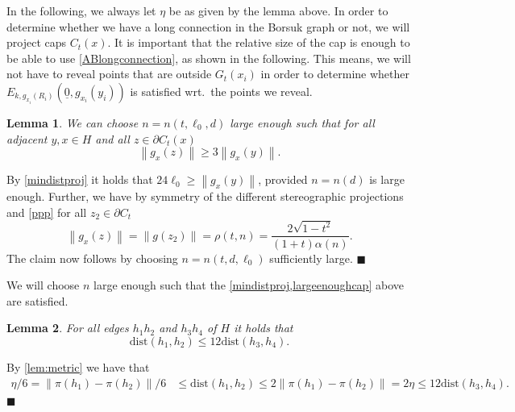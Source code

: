 \documentclass[11pt]{article}%
\newenvironment{proof}{\vspace{1ex}\noindent{\bf Proof.}}{\hspace*{\fill}$\blacksquare$\vspace{1ex}}
\newtheorem{lemma}[lemma]{Lemma}
\newcommand{\norm}[1]{\ensuremath{\left\|#1\right\|}}
\newcommand{\dists}{{\mathrm{dist}}}
\newcommand{\typ}{\underline{0}}
\begin{document}
\noindent
 In the following, we always let $ \eta $ be as given by the lemma above. In order to determine whether we have a long connection in the Borsuk graph or not, we will project caps $ C_t(x) $. It is important that the relative size of the cap is enough to be able to use \cref{ABlongconnection}, as shown in the following. This means, we will not have to reveal points that are outside  $ G_t(x_i) $ in order to determine whether $ E_{k,g_{x_i}(R_i)}(\typ,g_{x_i}(y_i))$ is satisfied 
 wrt.~the points we reveal.
 \begin{lemma}\label{largeenoughcap}
 	We can choose $ n=n(t,\ell_0,d) $ large enough such that for all adjacent $ y,x\in H $ and all $ z\in \partial C_t(x) $ 
 	\begin{equation*}
 		 \norm{g_{x}(z)}\geq 3 \norm{g_{x}(y)} .
 	\end{equation*}
 \end{lemma}
\begin{proof}
	By \cref{mindistproj} it holds that $ 24\ell_0 \geq \norm{g_{x}(y)} $, provided $ n=n(d) $ is large enough. Further, we have by symmetry of the different stereographic projections and \cref{ppp} for all $ z_2\in \partial C_t $  
	\begin{equation*}
	\norm{g_{x}(z)}=\norm{g(z_2)}=\rho(t,n)=\frac{2\sqrt{1-t^2}}{(1+t)\alpha(n)}.
	\end{equation*}
	The claim now follows by choosing $ n=n(t,d,\ell_0) $ sufficiently large.
\end{proof}

\noindent
  We will choose $ n $ large enough such that the \cref{mindistproj,largeenoughcap} above are satisfied. 
  \begin{lemma}\label{maxspheredist}
		For all edges $ h_1h_2 $ and $ h_3h_4 $ of $ H $ it holds that
		\begin{equation*}
			\dists(h_1,h_2)\leq12\dists(h_3,h_4).
		\end{equation*}
	\end{lemma}
\begin{proof}
	By \cref{lem:metric} we have that
	\begin{equation*}
		\begin{split}
			\eta/6=\norm{\pi(h_1)-\pi(h_2)}/6&\leq \dists(h_1,h_2)\leq 2\norm{\pi(h_1)-\pi(h_2)}=2\eta\leq  12\dists(h_3,h_4).
		\end{split}
	\end{equation*}
\end{proof}
\end{document}
